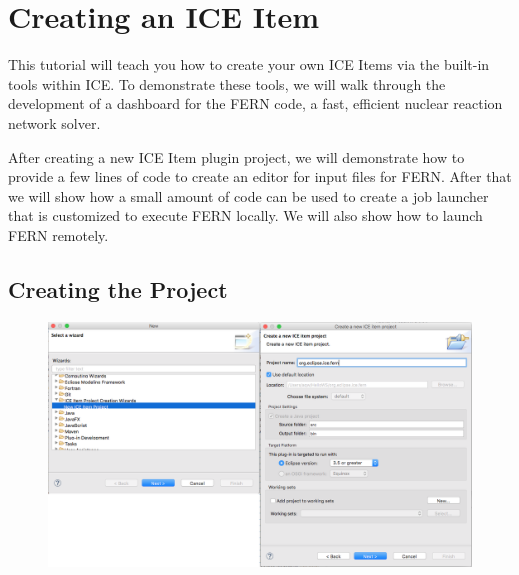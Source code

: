 \section{Creating an ICE Item} 

This tutorial will teach you how to
create your own ICE Items via the built-in tools within ICE.  To demonstrate
these tools, we will walk through the development of a dashboard for the
FERN code, a fast, efficient nuclear reaction network solver. 

After creating a new ICE Item plugin project, we will demonstrate how to
provide a few lines of code to create an editor for
input files for FERN. After that we will show how a small amount of code can be
used to create a job launcher that is customized to execute FERN locally. We
will also show how to launch FERN remotely.

\subsection{Creating the Project}

\begin{figure}[h]
\centering
\includegraphics[width=\textwidth]{figures/comb12.png}
\label{fig:comb12}
\end{figure}

